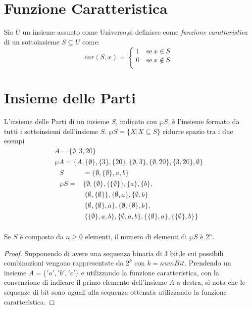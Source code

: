 \section{Funzione Caratteristica}
Sia $U$ un insieme assunto come Universo,si definisce come \emph{funzione caratteristica}
di un sottoinsieme $S \subseteq U$ come:
\begin{equation*}
    car(S,x) = \begin{cases} 1 \quad \text{se} \ x \in S \\
                             0 \quad \text{se} \ x \not \in S\\
               \end{cases}
\end{equation*}

\section{Insieme delle Parti}
L'insieme delle Parti di un insieme $S$, indicato con $\wp S$, è l'insieme formato
da tutti i sottoinsiemi dell'insieme $S$. \newline
$\wp S = \{X | X \subseteq S\} $
ridurre spazio tra i due esempi
\begin{align*}
A = \{\emptyset,3,20 \} \\
\wp A = \{A,\{\emptyset\},\{ 3\},\{ 20 \},\{ \emptyset,3 \},\{\emptyset,20 \},\{3,20\},\emptyset \} 
\end{align*}
\begin{align*}
S & = \{ \emptyset, \{ \emptyset \}, a,b\} \\
\wp S = & \{ \emptyset,\{\emptyset \},\{\{\emptyset\}\},\{a\},\{b\}, \\
        & \ \{ \emptyset,\{\emptyset\}\}, \{ \emptyset,a\},\{ \emptyset,b\} \\
        & \ \{ \emptyset,\{\emptyset\},a\},\{\emptyset,\{\emptyset\},b\}, \\
        & \ \{ \{\emptyset\},a,b\},\{ \emptyset,a,b\},\{\{\emptyset\},a\},\{\{\emptyset\},b\} \} \\
\end{align*}

\begin{defi}
Se $S$ è composto da $n \geq 0$ elementi, il numero di elementi di $\wp S$ è $2 ^ n$.
\end{defi}
\begin{proof}
Supponendo di avere una sequenza binaria di 3 bit,le cui possibili combinazioni
vengono rappresentate da $2 ^ k$ con $k = numBit$.\newline
Prendendo un insieme $A = \{'a','b','c' \}$ e utilizzando la funzione caratteristica,
con la convenzione di indicare il primo elemento dell'insieme $A$ a destra, si nota
che le sequenze di bit sono uguali alla sequenza ottenuta utilizzando la funzione caratteristica.
\end{proof}
